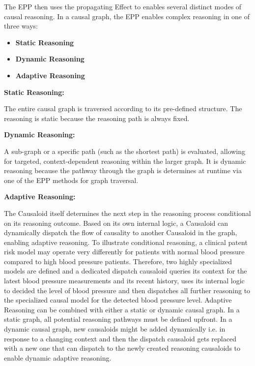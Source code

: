   
The EPP then uses the propagating Effect to enables several distinct modes of causal reasoning. In a causal graph, the EPP enables complex reasoning in one of three ways: 

\begin{itemize}	
	\item \textbf{Static Reasoning}
	\item \textbf{Dynamic Reasoning}
	\item \textbf{Adaptive Reasoning} 
\end{itemize}


\textbf{Static Reasoning:} 

The entire causal graph is traversed according to its pre-defined structure. The reasoning is static because the reasoning path is always fixed. 

\textbf{Dynamic Reasoning:} 

A sub-graph or a specific path (such as the shortest path) is evaluated, allowing for targeted, context-dependent reasoning within the larger graph. It is dynamic reasoning because the pathway through the graph is determines at runtime via one of the EPP methods for graph traversal. 

\textbf{Adaptive Reasoning:} 

The Causaloid itself determines the next step in the reasoning process conditional on its reasoning outcome. Based on its own internal logic, a Causaloid can dynamically dispatch the flow of causality to another Causaloid in the graph, enabling adaptive reasoning. To illustrate conditional reasoning, a clinical patent risk model may operate very differently for patients with normal blood pressure compared to high blood pressure patients. Therefore, two highly specialized models are defined and a dedicated dispatch causaloid queries its context for the latest blood pressure measurements and its recent history, uses its internal logic to decided the level of blood pressure and then dispatches all further reasoning to the specialized causal model for the detected blood pressure level. Adaptive Reasoning can be combined with either a static or dynamic causal graph. In a static graph, all potential reasoning pathways must be defined upfront. In a dynamic causal graph, new causaloids might be added dynamically i.e. in response to a changing context and then the dispatch causaloid gets replaced with a new one that can dispatch to the newly created reasoning causaloids to enable dynamic adaptive reasoning.  

%
%
